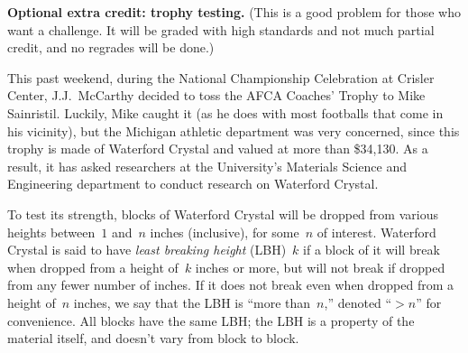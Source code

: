 \documentclass[11pt,addpoints]{exam}
\begin{document}
\begin{questions}

  \bonusquestion[5] \textbf{Optional extra credit: trophy testing.}
  (This is a good problem for those who want a challenge.
   It will be graded with high standards and not much partial credit, and no regrades will be done.)
  
  This past weekend, during the National Championship Celebration at Crisler Center, J.J.\ McCarthy decided to toss the AFCA Coaches' Trophy to Mike Sainristil.
  Luckily, Mike caught it (as he does with most footballs that come in his vicinity), but the Michigan athletic department was very concerned, since this trophy is made of Waterford Crystal and valued at more than \$34,130.
  As a result, it has asked researchers at the University's Materials Science and Engineering department to conduct research on Waterford Crystal.
 
  To test its strength, blocks of Waterford Crystal will be dropped from various heights between~$1$ and~$n$ inches (inclusive), for some~$n$ of interest.
  Waterford Crystal is said to have \emph{least breaking height} (LBH)~$k$ if a block of it will break when dropped from a height of~$k$ inches or more, but will not break if dropped from any fewer number of inches.
  If it does not break even when dropped from a height of~$n$ inches, we say that the LBH is ``more than~$n$,'' denoted ``$>n$'' for convenience.
  All blocks have the same LBH; the LBH is a property of the material itself, and doesn't vary from block to block.


\end{questions}
\end{document}
